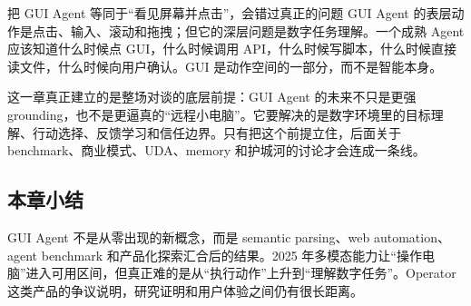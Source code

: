 \begin{warningbox}{把 GUI Agent 等同于“看见屏幕并点击”，会错过真正的问题}
GUI Agent 的表层动作是点击、输入、滚动和拖拽；但它的深层问题是数字任务理解。一个成熟 Agent 应该知道什么时候点 GUI，什么时候调用 API，什么时候写脚本，什么时候直接读文件，什么时候向用户确认。GUI 是动作空间的一部分，而不是智能本身。
\end{warningbox}

这一章真正建立的是整场对谈的底层前提：GUI Agent 的未来不只是更强 grounding，也不是更逼真的“远程小电脑”。它要解决的是数字环境里的目标理解、行动选择、反馈学习和信任边界。只有把这个前提立住，后面关于 benchmark、商业模式、UDA、memory 和护城河的讨论才会连成一条线。

\subsection{本章小结}

GUI Agent 不是从零出现的新概念，而是 semantic parsing、web automation、agent benchmark 和产品化探索汇合后的结果。2025 年多模态能力让“操作电脑”进入可用区间，但真正难的是从“执行动作”上升到“理解数字任务”。Operator 这类产品的争议说明，研究证明和用户体验之间仍有很长距离。

